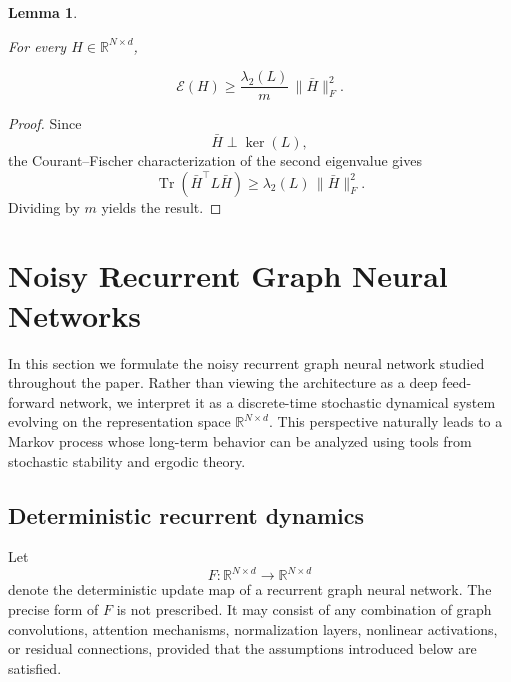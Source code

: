 \documentclass{article}
\newtheorem{lemma}[theorem]{Lemma}
\DeclareMathOperator{\Tr}{Tr}
\begin{document}
\begin{lemma}
	\label{lem:spectral_gap}
	
	For every
	$H\in\mathbb R^{N\times d}$,
	
	\[
	\mathcal E(H)
	\ge
	\frac{\lambda_2(L)}{m}
	\,
	\|\bar H\|_F^2.
	\]
	
\end{lemma}

\begin{proof}
	
	Since	
	\[
	\bar H
	\perp
	\ker(L),
	\]	
	the Courant--Fischer characterization of the second eigenvalue gives	
	\[
	\operatorname{\Tr}
	(
	\bar H^{\top}
	L
	\bar H
	)
	\ge
	\lambda_2(L)
	\,
	\|\bar H\|_F^2.
	\]
	Dividing by $m$ yields the result.
	
\end{proof}
	

\section{Noisy Recurrent Graph Neural Networks}
\label{sec:noisy_dynamics}

In this section we formulate the noisy recurrent graph neural network
studied throughout the paper.
Rather than viewing the architecture as a deep feed-forward network, we
interpret it as a discrete-time stochastic dynamical system evolving on
the representation space
$\mathbb{R}^{N\times d}$.
This perspective naturally leads to a Markov process whose long-term
behavior can be analyzed using tools from stochastic stability and
ergodic theory.

\subsection{Deterministic recurrent dynamics}

Let
\[
F:\mathbb{R}^{N\times d}
\longrightarrow
\mathbb{R}^{N\times d}
\]
denote the deterministic update map of a recurrent graph neural network.
The precise form of $F$ is not prescribed.
It may consist of any combination of graph convolutions,
attention mechanisms,
normalization layers,
nonlinear activations,
or residual connections,
provided that the assumptions introduced below are satisfied.
\end{document}
